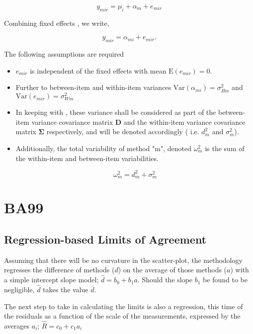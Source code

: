 \documentclass[12pt, a4paper]{report}
\theoremstyle{plain}
\theoremstyle{definition}
\theoremstyle{remark}
\begin{document}
	\[ y_{mir} = \mu_{i} + \alpha_{m} + e_{mir}  \]
	
	Combining fixed effects \citep{barnhart}, we write,
	
	\[ y_{mir} = \alpha_{mi} + e_{mir}.\]
	
	The following assumptions are required
	
	\begin{itemize}
		\item $e_{mir}$ is independent of the fixed effects with mean $\mbox{E}(e_{mir}) = 0$.
		\item Further to \citet{barnhart} between-item and within-item variances $\mbox{Var}(\alpha_{mi}) = \sigma^2_{Bm}$ and $\mbox{Var}(e_{mir}) = \sigma^2_{Wm}$
		\item In keeping with \citet{ARoy2009}, these variance shall be considered as part of the between-item variance covariance matrix $\boldsymbol{D}$ and the within-item variance covariance matrix  $\boldsymbol{\Sigma}$
		respectively, and will be denoted accordingly ( i.e. $d^2_{m}$ and $\sigma^2_{m}$).
		\item Additionally, the total variability of method "m", denoted $\omega^2_m$ is the sum of the within-item and between-item variabilities.
		
		\[ \omega^2_m = d^2_{m}+ \sigma^2_{m} \]
		
	\end{itemize}
	\newpage
	
	


\chapter{BA99}

\section{Regression-based Limits of Agreement} Assuming that
there will be no curvature in the scatter-plot, the methodology
regresses the difference of methods ($d$) on the average of those
methods ($a$) with a simple intercept slope model; $\hat{d} =
b_{0}+ b_{1}a.$ Should the slope $b_{1}$ be found to be
negligible, $\hat{d}$ takes the value $\bar{d}$.

The next step to take in calculating the limits is also a
regression, this time of the residuals as a function of the scale
of the measurements, expressed by the averages $a_{i}$;
$ \hat{R} = c_{0}+ c_{1}a_{i}$
\end{document}
